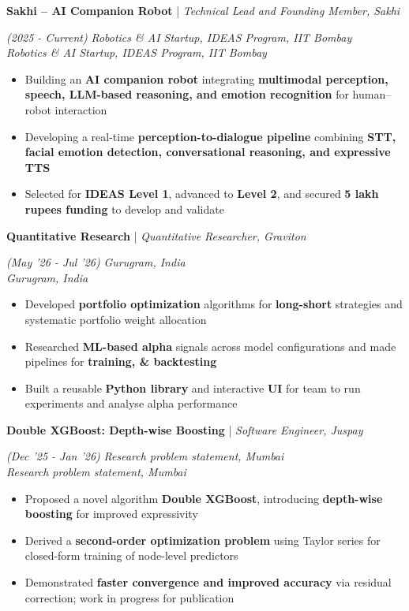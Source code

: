 \documentclass[10pt]{article}
\renewcommand{\subsection}[4]{
	\def\temp{#4}
	\vspace{2pt}
	{
		\large
		{\color{Green} \textbf{#1}} | {\sl #2} \filldate{#3}
		\ifx\temp\empty
		\else
		{
			\\[0.098em]
			\fontsize{10.5}{13.2}\selectfont
			\sl #4
		}
		\fi
	}
}
\newcommand{\filldate}[1]{\strut\hfill {\small \textit{(#1)}}}
\begin{document}
\subsection{Sakhi -- AI Companion Robot}{Technical Lead and Founding Member, Sakhi}{2025 - Current}{\textit{Robotics \& AI Startup, IDEAS Program, IIT Bombay}}
\begin{itemize}
    \item Building an \textbf{AI companion robot} integrating \textbf{multimodal perception, speech, LLM-based reasoning, and emotion recognition} for human--robot interaction
    \item Developing a real-time \textbf{perception-to-dialogue pipeline} combining \textbf{STT, facial emotion detection, conversational reasoning, and expressive TTS}
    \item Selected for \textbf{IDEAS Level 1}, advanced to \textbf{Level 2}, and secured \textbf{5 lakh rupees funding} to develop and validate 
\end{itemize}

\subsection{Quantitative Research}{Quantitative Researcher, Graviton}{May '26 - Jul '26}{\textit{Gurugram, India}}
\begin{itemize}
    \item Developed \textbf{portfolio optimization} algorithms for \textbf{long-short} strategies and systematic portfolio weight allocation
    \item Researched \textbf{ML-based alpha} signals across model configurations and made pipelines for \textbf{training, \& backtesting}
    \item Built a reusable \textbf{Python library} and interactive \textbf{UI} for team to run experiments and analyse alpha performance
\end{itemize}

\subsection{Double XGBoost: Depth-wise Boosting}{Software Engineer, Juspay}{Dec '25 - Jan '26}{\textit{Research problem statement, Mumbai}}
\begin{itemize}
\item Proposed a novel algorithm \textbf{Double XGBoost}, introducing \textbf{depth-wise boosting} for improved expressivity 
\item Derived a \textbf{second-order optimization problem} using Taylor series for closed-form training of node-level predictors
\item Demonstrated \textbf{faster convergence and improved accuracy} via residual correction; work in progress for publication
\end{itemize}
\vspace{-15px}
\end{document}
